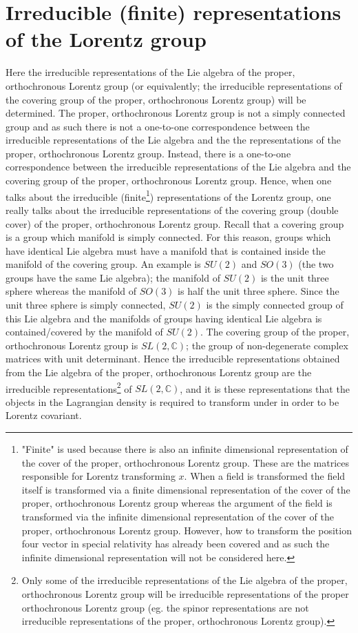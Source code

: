 \section{Irreducible (finite) representations of the Lorentz group}
Here the irreducible representations of the Lie algebra of the proper, orthochronous Lorentz group (or equivalently; the irreducible representations of the covering group of the proper, orthochronous Lorentz group) will be determined. The proper, orthochronous Lorentz group is not a simply connected group and as such there is not a one-to-one correspondence between the irreducible representations of the Lie algebra and the the representations of the proper, orthochronous Lorentz group. Instead, there is a one-to-one correspondence between the irreducible representations of the Lie algebra and the covering group of the proper, orthochronous Lorentz group. Hence, when one talks about the irreducible (finite\footnote{"Finite" is used because there is also an infinite dimensional representation of the cover of the proper, orthochronous Lorentz group. These are the matrices responsible for Lorentz transforming $x$. When a field is transformed the field itself is transformed via a finite dimensional representation of the cover of the proper, orthochronous Lorentz group whereas the argument of the field is transformed via the infinite dimensional representation of the cover of the proper, orthochronous Lorentz group. However, how to transform the position four vector in special relativity has already been covered and as such the infinite dimensional representation will not be considered here.}) representations of the Lorentz group, one really talks about the irreducible representations of the covering group (double cover) of the proper, orthochronous Lorentz group. Recall that a covering group is a group which manifold is simply connected. For this reason, groups which have identical Lie algebra must have a manifold that is contained inside the manifold of the covering group. An example is $SU(2)$ and $SO(3)$ (the two groups have the same Lie algebra); the manifold of $SU(2)$ is the unit three sphere whereas the manifold of $SO(3)$ is half the unit three sphere. Since the unit three sphere is simply connected, $SU(2)$ is the simply connected group of this Lie algebra and the manifolds of groups having identical Lie algebra is contained/covered by the manifold of $SU(2)$. The covering group of the proper, orthochronous Lorentz group is $SL(2,\mathbb{C})$; the group of non-degenerate complex matrices with unit determinant. Hence the irreducible representations obtained from the Lie algebra of the proper, orthochronous Lorentz group are the irreducible representations\footnote{Only some of the irreducible representations of the Lie algebra of the proper, orthochronous Lorentz group will be irreducible representations of the proper orthochronous Lorentz group (eg. the spinor representations are not irreducible representations of the proper, orthochronous Lorentz group).} of $SL(2,\mathbb{C})$, and it is these representations that the objects in the Lagrangian density is required to transform under in order to be Lorentz covariant.\newline

